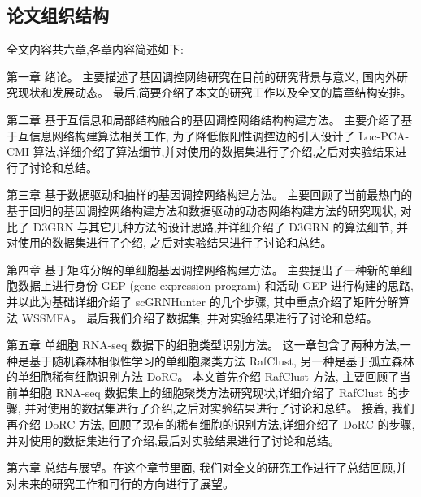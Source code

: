 \subsection{论文组织结构}

全文内容共六章,各章内容简述如下:

第一章 绪论。
主要描述了基因调控网络研究在目前的研究背景与意义, 国内外研究现状和发展动态。
最后,简要介绍了本文的研究工作以及全文的篇章结构安排。

第二章 基于互信息和局部结构融合的基因调控网络结构构建方法。
主要介绍了基于互信息网络构建算法相关工作, 为了降低假阳性调控边的引入设计了 Loc-PCA-CMI 算法,详细介绍了算法细节,并对使用的数据集进行了介绍,之后对实验结果进行了讨论和总结。

第三章 基于数据驱动和抽样的基因调控网络构建方法。
主要回顾了当前最热门的基于回归的基因调控网络构建方法和数据驱动的动态网络构建方法的研究现状,
对比了 D3GRN 与其它几种方法的设计思路,并详细介绍了 D3GRN 的算法细节,
并对使用的数据集进行了介绍, 之后对实验结果进行了讨论和总结。

第四章 基于矩阵分解的单细胞基因调控网络构建方法。
主要提出了一种新的单细胞数据上进行身份 GEP (gene expression program) 和活动 
GEP 进行构建的思路, 并以此为基础详细介绍了 scGRNHunter 的几个步骤, 其中重点介绍了矩阵分解算法 WSSMFA。
最后我们介绍了数据集, 并对实验结果进行了讨论和总结。



第五章 单细胞 RNA-seq 数据下的细胞类型识别方法。
这一章包含了两种方法,一种是基于随机森林相似性学习的单细胞聚类方法 RafClust,
另一种是基于孤立森林的单细胞稀有细胞识别方法 DoRC。
本文首先介绍 RafClust 方法, 主要回顾了当前单细胞 RNA-seq 数据集上的细胞聚类方法研究现状,详细介绍了 RafClust 的步骤,
并对使用的数据集进行了介绍,之后对实验结果进行了讨论和总结。
接着, 我们再介绍 DoRC 方法, 回顾了现有的稀有细胞的识别方法,详细介绍了 DoRC 的步骤,
并对使用的数据集进行了介绍,最后对实验结果进行了讨论和总结。

第六章 总结与展望。在这个章节里面, 我们对全文的研究工作进行了总结回顾,并对未来的研究工作和可行的方向进行了展望。